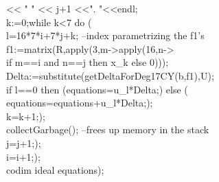 \                     << "    " << j+1 <<". "<<endl;\\
\                     k:=0;while k<7 do (\\
\                        l=16*7*i+7*j+k; --index parametrizing the f1's\\
\                        f1:=matrix(R,apply(3,m->apply(16,n->\\
\                             if m==i and n==j then x_k else 0)));\\
\                        Delta:=substitute(getDeltaForDeg17CY(b,f1),U);\\
\                        if l==0 then (equations=u_l*Delta;) else (\\
\                             equations=equations+u_l*Delta;);\\
\                        k=k+1;);\\
\                     collectGarbage(); --frees up memory in the stack\\
\                     j=j+1;);\\
\                i=i+1;);\\
\           codim ideal equations);\\
\endOutput


